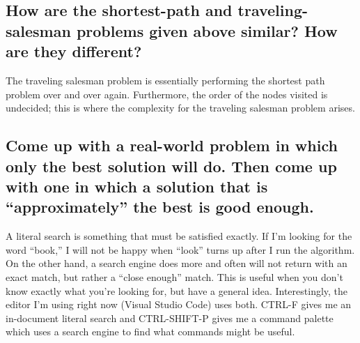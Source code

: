 \subsection
{How are the shortest-path and traveling-salesman problems given above similar?
How are they different?}
    The traveling salesman problem is essentially performing the shortest path problem over and over again. 
    Furthermore, the order of the nodes visited is undecided; this is where the complexity for the traveling 
    salesman problem arises.
\subsection
{Come up with a real-world problem in which only the best solution will do. Then
come up with one in which a solution that is “approximately” the best is good
enough.}
    A literal search is something that must be satisfied exactly. If I'm looking for the word ``book,'' I will not be 
    happy when ``look'' turns up after I run the algorithm. On the other hand, a search engine does more and often 
    will not return with an exact match, but rather a ``close enough'' match. This is useful when you don't know 
    exactly what you're looking for, but have a general idea. Interestingly, the editor I'm using right now (Visual 
    Studio Code) uses both. CTRL-F gives me an in-document literal search and CTRL-SHIFT-P gives me a command palette
    which uses a search engine to find what commands might be useful.
\solid